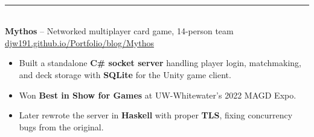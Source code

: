 \documentclass[letterpaper, 11pt]{article}
\newcommand{\header}[1]{%
  \vspace{5pt}{\large\scshape #1}\\[-7pt]\rule{\linewidth}{0.4pt}\\[1pt]}
\begin{document}
\header{Projects}
\textbf{Mythos} -- Networked multiplayer card game, 14-person team \hfill \href{https://djw191.github.io/Portfolio/blog/Mythos/}{djw191.github.io/Portfolio/blog/Mythos}
\begin{itemize}
  \item Built a standalone \textbf{C\# socket server} handling player login, matchmaking, and deck storage with \textbf{SQLite} for the Unity game client.
  \item Won \textbf{Best in Show for Games} at UW-Whitewater's 2022 MAGD Expo.
  \item Later rewrote the server in \textbf{Haskell} with proper \textbf{TLS}, fixing concurrency bugs from the original.
\end{itemize}
\end{document}
